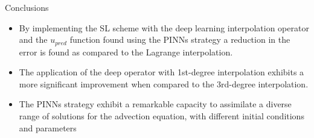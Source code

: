 \begin{frame}{Conclusions}
    \begin{itemize}

        \item By implementing the SL scheme with the deep learning interpolation operator and the
        $u_{pred}$ function found using the PINNs strategy a reduction in the error is found as compared to the Lagrange interpolation.
        
        \item The application of the deep operator with 1st-degree interpolation exhibits a more significant improvement when compared to the 3rd-degree interpolation.
    
        \item The  PINNs  strategy  exhibit  a  remarkable capacity to assimilate a diverse range of solutions for the advection equation, with different initial conditions and parameters
    
    \end{itemize}

\end{frame}